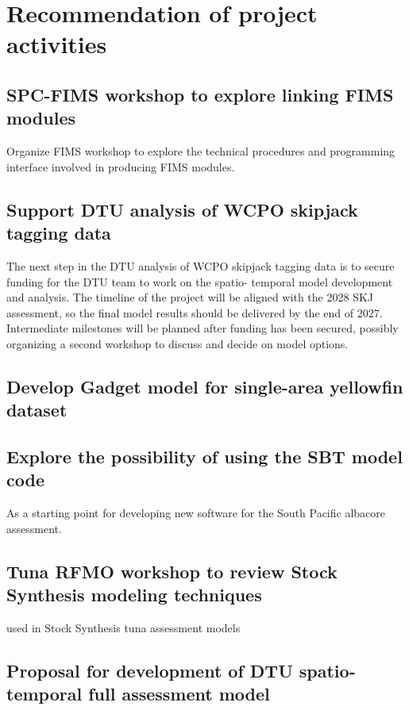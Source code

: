 \documentclass{SCreport}
\begin{document}
\section{Recommendation of project activities}

\subsection{SPC-FIMS workshop to explore linking FIMS modules}
\label{sec:fims-workshop}

Organize FIMS workshop to explore the technical procedures and programming
interface involved in producing FIMS modules.

\subsection{Support DTU analysis of WCPO skipjack tagging data}
\label{sec:dtu-support-tagging}

The next step in the DTU analysis of WCPO skipjack tagging data is to secure
funding for the DTU team to work on the spatio- temporal model development and
analysis. The timeline of the project will be aligned with the 2028 SKJ
assessment, so the final model results should be delivered by the end of 2027.
Intermediate milestones will be planned after funding has been secured, possibly
organizing a second workshop to discuss and decide on model options.

\subsection{Develop Gadget model for single-area yellowfin dataset}
\label{sec:yft-gadget}

\subsection{Explore the possibility of using the SBT model code}

As a starting point for developing new software for the South Pacific albacore
assessment.

\subsection{Tuna RFMO workshop to review Stock Synthesis modeling techniques}
\label{sec:ss-workshop}

used in Stock Synthesis tuna assessment models

\subsection{Proposal for development of DTU spatio-temporal full assessment
  model}
\label{sec:dtu-support-assessment}
\end{document}
